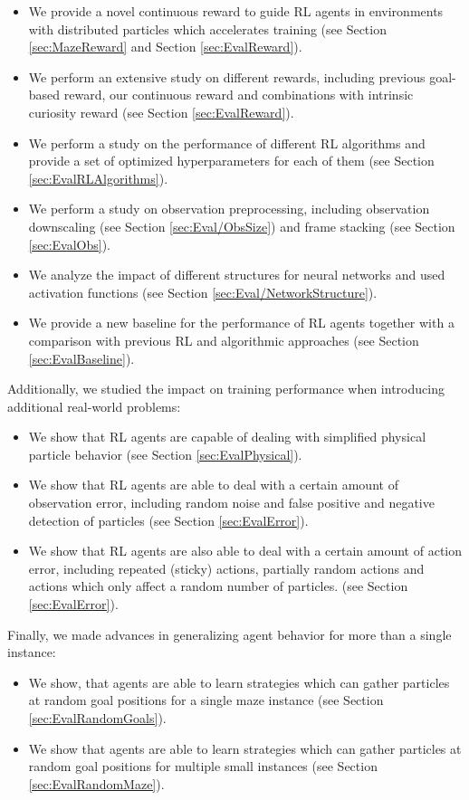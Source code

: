 \begin{itemize}
    \item We provide a novel continuous reward to guide RL agents in environments with distributed particles which accelerates training (see Section \ref{sec:MazeReward} and Section \ref{sec:EvalReward}).
    \item We perform an extensive study on different rewards, including previous goal-based reward, our continuous reward and combinations with intrinsic curiosity reward (see Section \ref{sec:EvalReward}).
    \item We perform a study on the performance of different RL algorithms and provide a set of optimized hyperparameters for each of them (see Section \ref{sec:EvalRLAlgorithms}).
    \item We perform a study on observation preprocessing, including observation downscaling (see Section \ref{sec:Eval/ObsSize}) and frame stacking (see Section \ref{sec:EvalObs}).
    \item We analyze the impact of different structures for neural networks and used activation functions (see Section \ref{sec:Eval/NetworkStructure}).
    \item We provide a new baseline for the performance of RL agents together with a comparison with previous RL and algorithmic approaches (see Section \ref{sec:EvalBaseline}).  
\end{itemize}

Additionally, we studied the impact on training performance when introducing additional real-world problems:

\begin{itemize}
    \item We show that RL agents are capable of dealing with simplified physical particle behavior (see Section \ref{sec:EvalPhysical}).
    \item We show that RL agents are able to deal with a certain amount of observation error, including random noise and false positive and negative detection of particles (see Section \ref{sec:EvalError}).
    \item We show that RL agents are also able to deal with a certain amount of action error, including repeated (sticky) actions, partially random actions and actions which only affect a random number of particles. (see Section \ref{sec:EvalError}). 
\end{itemize}

Finally, we made advances in generalizing agent behavior for more than a single instance:

\begin{itemize}
    \item We show, that agents are able to learn strategies which can gather particles at random goal positions for a single maze instance (see Section \ref{sec:EvalRandomGoals}).
    \item We show that agents are able to learn strategies which can gather particles at random goal positions for multiple small instances (see Section \ref{sec:EvalRandomMaze}).
\end{itemize}

